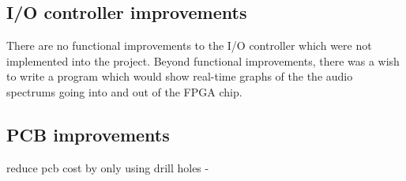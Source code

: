 \subsection{I/O controller improvements}

There are no functional improvements to the I/O controller which were not
implemented into the project. Beyond functional improvements, there was a
wish to write a program which would show real-time graphs of the the audio
spectrums going into and out of the FPGA chip.

\subsection{PCB improvements}
reduce pcb cost by only using drill holes -

